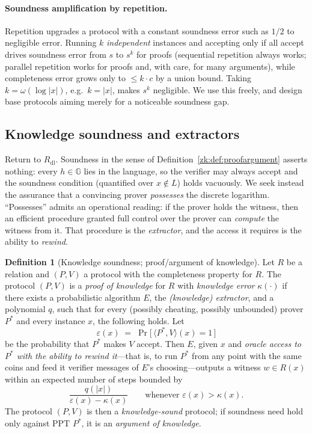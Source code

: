 \documentclass[11pt,a4paper]{article}
\theoremstyle{definition}
\newtheorem{definition}[theorem]{Definition}
\theoremstyle{remark}
\newcommand{\G}{\ensuremath{\mathbb{G}}}
\begin{document}
\paragraph{Soundness amplification by repetition.} Repetition upgrades a protocol with a constant soundness error such as \(1/2\) to negligible error. Running \(k\) \emph{independent} instances and accepting only if all accept drives soundness error from \(s\) to \(s^k\) for proofs (sequential repetition always works; parallel repetition works for proofs and, with care, for many arguments), while completeness error grows only to \(\le k\cdot c\) by a union bound. Taking \(k = \omega(\log|x|)\), e.g.\ \(k = |x|\), makes \(s^k\) negligible. We use this freely, and design base protocols aiming merely for a noticeable soundness gap.
\subsection{Knowledge soundness and extractors}\label{zk:subsec:knowledge}

Return to \(R_{\mathrm{dl}}\). Soundness in the sense of Definition~\ref{zk:def:proofargument} asserts nothing: every \(h\in\G\) lies in the language, so the verifier may always accept and the soundness condition (quantified over \(x\notin L\)) holds vacuously. We seek instead the assurance that a convincing prover \emph{possesses} the discrete logarithm. ``Possesses'' admits an operational reading: if the prover holds the witness, then an efficient procedure granted full control over the prover can \emph{compute} the witness from it. That procedure is the \emph{extractor}, and the access it requires is the ability to \emph{rewind}.

\begin{definition}[Knowledge soundness; proof/argument of knowledge]\label{zk:def:knowledge}
Let \(R\) be a relation and \((P,V)\) a protocol with the completeness property for \(R\). The protocol \((P,V)\) is a \emph{proof of knowledge} for \(R\) with \emph{knowledge error} \(\kappa(\cdot)\) if there exists a probabilistic algorithm \(E\), the \emph{(knowledge) extractor}, and a polynomial \(q\), such that for every (possibly cheating, possibly unbounded) prover \(P^*\) and every instance \(x\), the following holds. Let
\[
  \varepsilon(x) \;=\; \Pr\!\big[\, \langle P^*, V\rangle(x) = 1 \,\big]
\]
be the probability that \(P^*\) makes \(V\) accept. Then \(E\), given \(x\) and \emph{oracle access to \(P^*\) with the ability to rewind it}---that is, to run \(P^*\) from any point with the same coins and feed it verifier messages of \(E\)'s choosing---outputs a witness \(w \in R(x)\) within an expected number of steps bounded by
\[
  \frac{q(|x|)}{\varepsilon(x) - \kappa(x)} \qquad\text{whenever } \varepsilon(x) > \kappa(x).
\]
The protocol \((P,V)\) is then a \emph{knowledge-sound} protocol; if soundness need hold only against PPT \(P^*\), it is an \emph{argument of knowledge}.
\end{definition}
\end{document}
